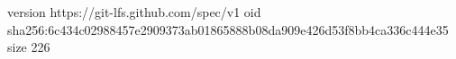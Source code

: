 version https://git-lfs.github.com/spec/v1
oid sha256:6c434c02988457e2909373ab01865888b08da909e426d53f8bb4ca336c444e35
size 226
